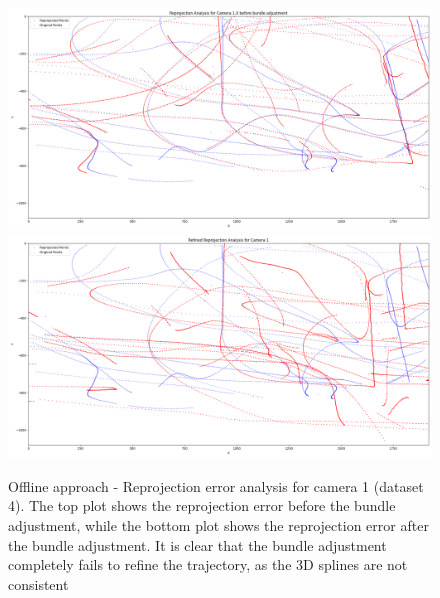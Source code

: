\documentclass[11pt]{article}
\begin{document}
\begin{figure}[h]
    \centering
    \includegraphics[width=\textwidth]{../plots/dataset4/reprojection_analysis_camera_1_before_ba_.png}
    \includegraphics[width=\textwidth]{../plots/dataset4/reprojection_analysis_camera_1.png}
    \caption{Offline approach - Reprojection error analysis for camera 1 (dataset 4). The top plot shows the reprojection error before the bundle adjustment, while the bottom plot shows the reprojection error after the bundle adjustment. It is clear that the bundle adjustment completely fails to refine the trajectory, as the 3D splines are not consistent}
    \label{fig:bad_ba}
\end{figure}



\end{document}
